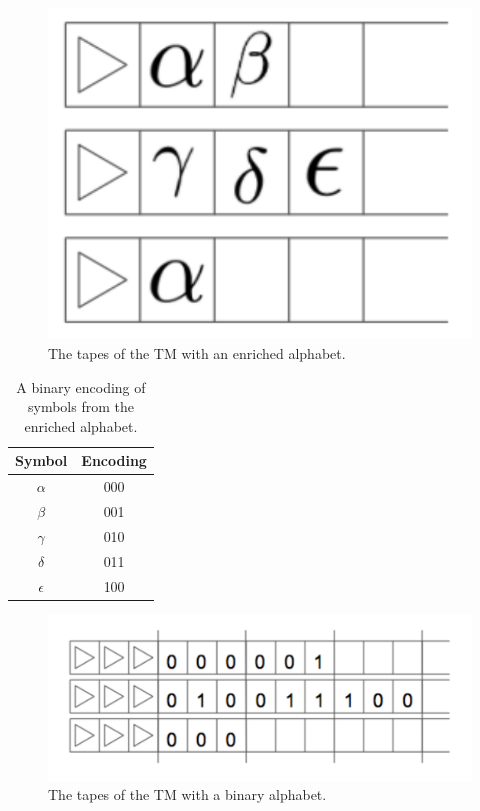 \documentclass[usletter]{article}
\begin{document}
\begin{figure}[h!]
\begin{center}
\includegraphics[width=.2\textwidth]{enriched}
\end{center}
\caption{The tapes of the TM with an enriched alphabet.}
\label{fig:enriched}
\end{figure}

\begin{table}[h!]
\begin{center}
\begin{tabular}{c | c}
\textbf{Symbol} & \textbf{Encoding}\\\hline
$\alpha$ & 000\\
$\beta$ & 001\\
$\gamma$ & 010\\
$\delta$ & 011\\
$\epsilon$ & 100\\
\end{tabular}
\end{center}
\caption{A binary encoding of symbols from the enriched alphabet.}
\label{table:encoding}
\end{table}

\begin{figure}[h!]
\begin{center}
\includegraphics[width=.6\textwidth]{encoded}
\end{center}
\caption{The tapes of the TM with a binary alphabet.}
\label{fig:encoded}
\end{figure}
\end{document}

